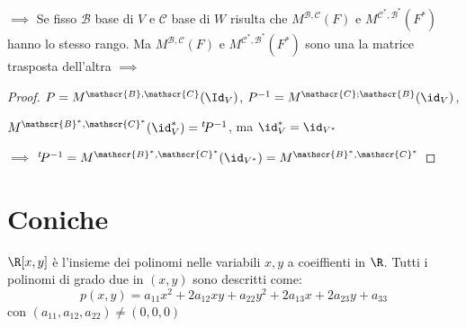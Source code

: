 $\implies$ Se fisso $ \mathscr{B} $ base di $ V $ e $ \mathscr{C} $ base di $ W $ risulta che $ M^{ \mathscr{B}, \mathscr{C}}(F) $ e $ M^{ \mathscr{C}^{*}, \mathscr{B}^{*}}(F^{*})$ hanno lo stesso rango. Ma $ M^{ \mathscr{B}, \mathscr{C}}(F) $ e $ M^{ \mathscr{C}^{*}, \mathscr{B}^{*}}(F^{*})$ sono una la matrice trasposta dell'altra $\implies$
\begin{proof}
    $P=M^{ \mathscr{B}, \mathscr{C}}(\Id_{V} )$, $ P^{-1}=M^{ \mathscr{C}; \mathscr{B}}(\id_{V} ) $, 
    
    $ M^{ \mathscr{B}^{*}, \mathscr{C}^{*}}(\id_{V}^{*} ) = \null^{t}\!P^{-1} $, ma $ \id_{V}^{*}=\id_{V^{*}}   $ 
    
    $\implies$ $ \null^{t}\!P^{-1}=  M^{ \mathscr{B}^{*}, \mathscr{C}^{*}}(\id_{V^{*}} ) =  M^{ \mathscr{B}^{*}, \mathscr{C}^{*}} $
\end{proof}

\section{Coniche}


$ \R[x,y] $ è l'insieme dei polinomi nelle variabili $ x,y $ a coeiffienti in $ \R $. Tutti i polinomi di grado due in $ (x,y) $ sono descritti come: 
\[
    p(x,y)=a_{11} x^{2} + 2 a_{12} xy + a_{22}y^{2} + 2 a_{13}x + 2 a_{23} y + a_{33}
\]
con $ (a_{11}, a_{12}, a_{22})\neq (0,0,0) $

